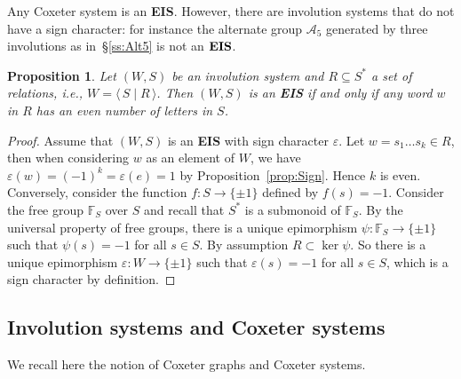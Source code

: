 \documentclass[A4paper, oneside]{amsart}
\newcommand{\id}{\textit{e}}
\newcommand{\mpair}[1]{\langle\, #1\,\rangle}  %
\newcommand{\EIS}{\textnormal{\bf EIS}\xspace}
\newtheorem{prop}[thm]{Proposition}
\theoremstyle{definition}
\begin{document}
Any Coxeter system is an \EIS. However, there are involution systems that do not have a sign character: for instance the alternate group $\mathcal A_5$ generated by three involutions as in~\S\ref{ss:Alt5} is not an $\EIS$.

\begin{prop}\label{prop:EIS-relations} Let $(W,S)$ be an involution system and $R\subseteq S^*$ a set of relations, i.e., $W=\mpair{S\mid R}$. Then $(W,S)$ is an \EIS if and only if any word $w$ in $R$ has an even number of letters in $S$. 
\end{prop}
\begin{proof} Assume that $(W,S)$ is an \EIS with sign character $\varepsilon$. Let $w=s_1\dots s_k\in R$, then when considering $w$ as an element of $W$, we have $\varepsilon(w)=(-1)^k=\varepsilon(\id)=1$ by Proposition~\ref{prop:Sign}. Hence $k$ is even. Conversely, consider the function $f:S\to \{\pm 1\}$ defined by $f(s)=-1$. Consider the free group $\mathbb F_S$ over $S$ and recall that $S^*$ is a submonoid of $\mathbb F_S$. By  the universal property of free groups, there is a unique epimorphism $\psi:\mathbb F_S \to \{\pm 1\}$ such that $\psi(s)=-1$ for all $s\in S$. By assumption $R\subset\ker\psi$. So there is a unique epimorphism $\varepsilon:W\to \{\pm 1\}$ such that $\varepsilon(s)=-1$ for all $s\in S$, which is a sign character by definition. 
\end{proof}


\subsection{Involution systems and Coxeter systems}\label{ss:Coxeter}

We recall here the notion of Coxeter graphs and Coxeter systems. 
\end{document}
